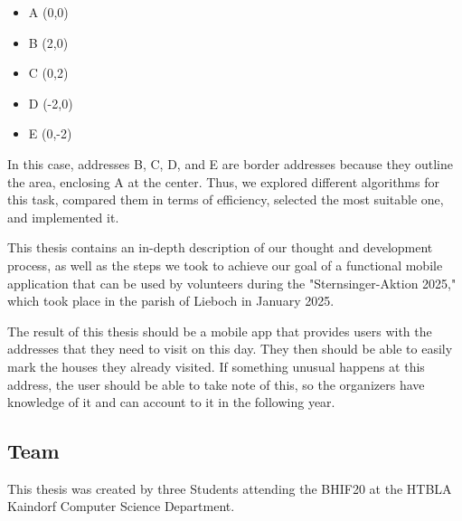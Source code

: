     \begin{itemize}
        \item A (0,0)
        \item B (2,0)
        \item C (0,2)
        \item D (-2,0)
        \item E (0,-2)
    \end{itemize}


In this case, addresses B, C, D, and E are border addresses because they outline the area, enclosing A at the center.
 Thus, we explored different algorithms for this task, compared them in terms of efficiency, selected the most suitable one, and implemented it.

\blankLine

This thesis contains an in-depth description of our thought and development process, as well as the steps we took to achieve our goal of a functional mobile application that can be used by volunteers during the "Sternsinger-Aktion 2025," which took place in the parish of Lieboch in January 2025.

\blankLine


The result of this thesis should be a mobile app that provides users with the addresses that they need to visit on this day. They then should be able to easily mark the houses they already visited. If something unusual happens at this address, the user should be able to take note of this, so the organizers have knowledge of it and can account to it in the following year.


\newpage

\subsection{Team}

This thesis was created by three Students attending the BHIF20 at the
HTBLA Kaindorf Computer Science Department.

\blankLine


